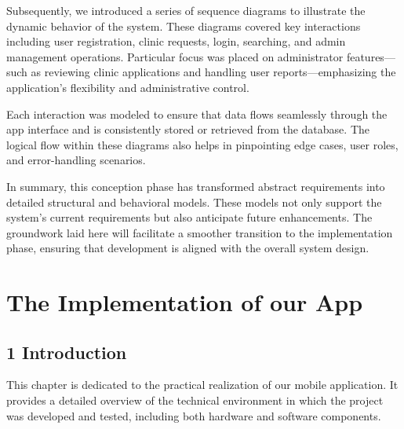 \documentclass[12pt]{report}
\begin{document}
\vspace{1em}

\noindent
Subsequently, we introduced a series of sequence diagrams to illustrate the dynamic behavior of the system. These diagrams covered key interactions including user registration, clinic requests, login, searching, and admin management operations. Particular focus was placed on administrator features—such as reviewing clinic applications and handling user reports—emphasizing the application's flexibility and administrative control.

\vspace{1em}

\noindent
Each interaction was modeled to ensure that data flows seamlessly through the app interface and is consistently stored or retrieved from the database. The logical flow within these diagrams also helps in pinpointing edge cases, user roles, and error-handling scenarios.

\vspace{1em}

\noindent
In summary, this conception phase has transformed abstract requirements into detailed structural and behavioral models. These models not only support the system’s current requirements but also anticipate future enhancements. The groundwork laid here will facilitate a smoother transition to the implementation phase, ensuring that development is aligned with the overall system design.















\newpage

\chapter{The Implementation of our App}
\section*{1 Introduction}
This chapter is dedicated to the practical realization of our mobile application. It provides a detailed overview of the technical environment in which the project was developed and tested, including both hardware and software components.\vspace{0.5cm}
\end{document}
